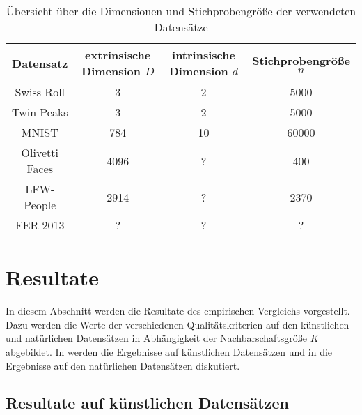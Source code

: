 \begin{table}[]
	\centering
	\begin{tabular}{@{}cccc@{}}
		\toprule
		Datensatz      & extrinsische Dimension $D$ & intrinsische Dimension $d$ & Stichprobengröße $n$ \\ \midrule
		Swiss Roll     & 3                          & 2                          & 5000                 \\
		Twin Peaks     & 3                          & 2                          & 5000                 \\
		MNIST          & 784                        & 10                         & 60000                \\
		Olivetti Faces & 4096                       & ?                          & 400                  \\
		LFW-People     & 2914                       & ?                          & 2370                 \\
		FER-2013       & ?                          & ?                          & ?                    \\ \bottomrule
	\end{tabular}
	\caption{Übersicht über die Dimensionen und Stichprobengröße der verwendeten Datensätze}
	\label{tab:uebersicht-datensaetze}
\end{table}
\section{Resultate}
\label{ch:Vergleich:sec:Resultate}

In diesem Abschnitt werden die Resultate des empirischen Vergleichs vorgestellt. Dazu werden die
Werte der verschiedenen Qualitätskriterien auf den künstlichen und natürlichen Datensätzen in
Abhängigkeit der Nachbarschaftsgröße $K$ abgebildet. In
 werden die Ergebnisse auf künstlichen Datensätzen
und in  die Ergebnisse auf den natürlichen
Datensätzen diskutiert.

\subsection{Resultate auf künstlichen Datensätzen}
\label{ch:Vergleich:sec:Resultate:kuenstlich}

